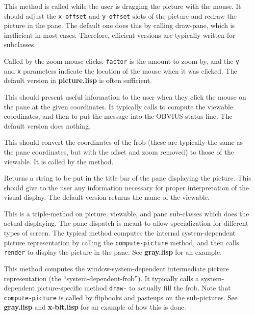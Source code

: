 \begin{description}
\item{}
This method is called while the user is dragging the picture with the
mouse.  It should adjust the {\tt x-offset} and {\tt y-offset} slots
of the picture and redraw the picture in the pane.  The default one
does this by calling draw-pane, which is inefficient in most cases.
Therefore, efficient versions are typically written for subclasses.

\item{}
Called by the zoom mouse clicks.  {\tt factor} is the amount to zoom
by, and the {\tt y} and {\tt x} parameters indicate the location of
the mouse when it was clicked.  The default version in {\bf
picture.lisp} is often sufficient.

\item{}
This should present useful information to the user when they click the
mouse on the pane at the given coordinates.  It typically calls
 to compute the viewable coordinates, and
then  to put the message into the OBVIUS status line.
The default version does nothing.

\item{}
This should convert the coordinates of the frob (these are typically
the same as the pane coordinates, but with the offset and zoom
removed) to those of the viewable.  It is called by the 
 method.

\item{}
Returns a string to be put in the title bar of the pane displaying the
picture.  This should give to the user any information necessary for
proper interpretation of the visual display.  The default version
returns the name of the viewable.

\item{}
This is a triple-method on picture, viewable, and pane sub-classes
which does the actual displaying.  The pane dispatch is meant to allow
specialization for different types of screen.  The typical method
computes the internal system-dependent picture representation by
calling the {\tt compute-picture} method, and then calls {\tt render}
to display the picture in the pane.  See {\bf gray.lisp} for an example.

\item{}
This method computes the window-system-dependent intermediate picture
representation (the ``system-dependent-frob'').  It typically calls a
system-dependent picture-specific method {\tt draw-} to
actually fill the frob.  Note that {\tt compute-picture} is called by
flipbooks and pasteups on the sub-pictures.  See {\bf gray.lisp} and
{\bf x-blt.lisp} for an example of how this is done.


\end{description}
